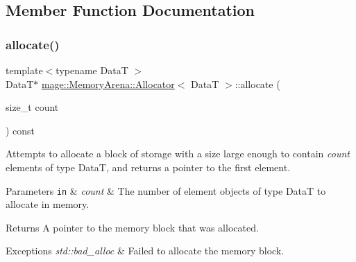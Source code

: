\subsection{Member Function Documentation}
\mbox{\label{classmage_1_1_memory_arena_1_1_allocator_a46d428590d87f47742abc173858ccc95}} 
\subsubsection{\texorpdfstring{allocate()}{allocate()}\hspace{0.1cm}{\footnotesize\ttfamily [1/2]}}
{\footnotesize\ttfamily template$<$typename DataT $>$ \\
DataT$\ast$ \mbox{\hyperlink{classmage_1_1_memory_arena_1_1_allocator}{mage\+::\+Memory\+Arena\+::\+Allocator}}$<$ DataT $>$\+::allocate (\begin{DoxyParamCaption}\item[{size\+\_\+t}]{count }\end{DoxyParamCaption}) const}

Attempts to allocate a block of storage with a size large enough to contain {\itshape count} elements of type {\ttfamily DataT}, and returns a pointer to the first element.


\begin{DoxyParams}[1]{Parameters}
\mbox{\tt in}  & {\em count} & The number of element objects of type {\ttfamily DataT} to allocate in memory. \\
\hline
\end{DoxyParams}
\begin{DoxyReturn}{Returns}
A pointer to the memory block that was allocated. 
\end{DoxyReturn}

\begin{DoxyExceptions}{Exceptions}
{\em std\+::bad\+\_\+alloc} & Failed to allocate the memory block. \\
\hline
\end{DoxyExceptions}
\mbox{\label{classmage_1_1_memory_arena_1_1_allocator_a699a98f902dddd5ad2b8477b8ed5f77b}} 
